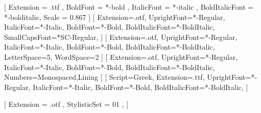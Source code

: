 % 
%
\setmainfont{serif}[
  Extension = .ttf ,
  BoldFont = *-bold ,
  ItalicFont = *-italic ,
  BoldItalicFont = *-bolditalic,
  Scale = 0.867
]
\setsansfont{AlegreyaSans}[
  Extension=.otf,
  UprightFont=*-Regular,
  ItalicFont=*-Italic,
  BoldFont=*-Bold,
  BoldItalicFont=*-BoldItalic,
  SmallCapsFont=*SC-Regular,
]
[
  Extension=.otf,
  UprightFont=*-Regular,
  ItalicFont=*-Italic,
  BoldFont=*-Bold,
  BoldItalicFont=*-BoldItalic,
  LetterSpace=5,
  WordSpace=2
]
[
  Extension=.otf,
  UprightFont=*-Regular,
  ItalicFont=*-Italic,
  BoldFont=*-Bold,
  BoldItalicFont=*-BoldItalic,
  Numbers={Monospaced,Lining}
]
[
  Script=Greek,
  Extension=.ttf,
  UprightFont=*-Regular,
  ItalicFont=*-Italic,
  BoldFont=*-Bold,
  BoldItalicFont=*-BoldItalic,
]

% 
%

\usepackage{unicode-math}

[%
  Extension = .otf ,
  StylisticSet = 01 ,
]

%
%


